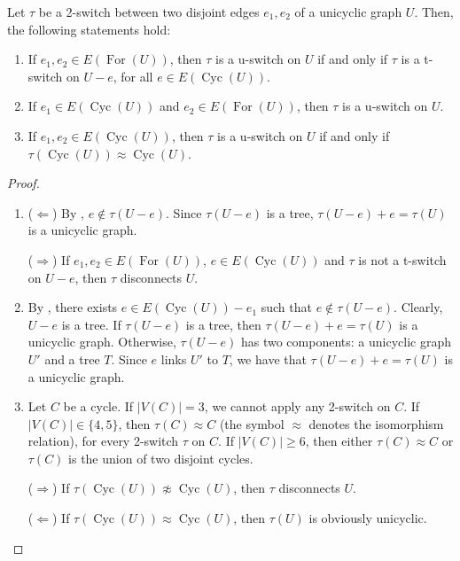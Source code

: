 \documentclass{BICA}
\newcommand{\Forest}{\operatorname{For}}
\newcommand{\Cycles}{\operatorname{Cyc}}
\begin{document}
\begin{theorem}
	\label{uswitchcaract}
	Let $\tau$ be a 2-switch between two disjoint edges $e_{1}, e_{2}$ of a unicyclic graph $U$. Then, the following statements hold:
	\begin{enumerate}
		\item If $e_{1},e_{2}\in E(\Forest(U))$, then \(\tau\) is a u-switch on $U$ if and only if $\tau$ is a t-switch on $U-e$, for all $e\in E(\Cycles(U))$.

		\item If $e_{1}\in E(\Cycles(U))$ and $e_{2}\in E(\Forest(U))$, then \(\tau\) is a u-switch on $U$.

		\item If $e_{1},e_{2}\in E(\Cycles(U))$, then \(\tau\) is a u-switch on $U$ if and only if $\tau(\Cycles(U))\approx \Cycles(U)$.
	\end{enumerate}
\end{theorem}

\begin{proof}
	\begin{enumerate}[label=(\arabic*).]
		\item (\(\Leftarrow\)) By , \(e \notin \tau(U-e)\). Since \(\tau(U-e)\) is a tree, \(\tau(U-e)+e=\tau(U)\) is a unicyclic graph.

		(\(\Rightarrow\))  If $e_{1},e_{2}\in E(\Forest(U))$, $e\in E(\Cycles(U))$ and $\tau$ is not a t-switch on $U-e$, then \(\tau\) disconnects $U$.

		\item By , there exists \(e \in E(\Cycles(U))-e_{1}\) such that \(e\notin\tau(U-e)\). Clearly, $U-e$ is a tree. If $\tau(U-e)$ is a tree, then \(\tau(U-e)+e=\tau(U)\) is a unicyclic graph. Otherwise, $\tau(U-e)$ has two components: a unicyclic graph $U'$ and a tree $T$. Since $e$ links $U'$ to $T$, we have that $\tau(U-e)+e=\tau(U)$ is a unicyclic graph.

		\item Let $C$ be a cycle. If $|V(C)|=3$, we cannot apply any 2-switch on $C$. If $|V(C)|\in\{4,5\}$, then $\tau(C)\approx C$ (the symbol $\approx$ denotes the isomorphism relation), for every 2-switch $\tau$ on $C$. If $|V(C)|\geq 6$, then either $\tau(C)\approx C$ or $\tau(C)$ is the union of two disjoint cycles.

		(\(\Rightarrow\)) If $\tau(\Cycles(U))\not\approx \Cycles(U)$, then \(\tau\) disconnects $U$.

		(\(\Leftarrow\)) If $\tau(\Cycles(U))\approx \Cycles(U)$, then $\tau(U)$ is obviously unicyclic. \qedhere
	\end{enumerate}
\end{proof}
\end{document}
